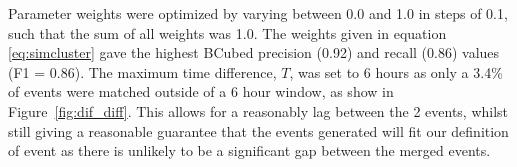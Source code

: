 Parameter weights were optimized by varying between 0.0 and 1.0 in steps of 0.1, such that the sum of all weights was 1.0.
The weights given in equation \ref{eq:simcluster} gave the highest BCubed precision (0.92) and recall (0.86) values (F1 = 0.86).
The maximum time difference, $T$, was set to 6 hours  as only a 3.4\% of events were matched outside of a 6 hour window, as show in Figure~\ref{fig:dif_diff}.
This allows for a reasonably lag between the 2 events, whilst still giving a reasonable guarantee that the events generated will fit our definition of event as there is unlikely to be a significant gap between the merged events.
